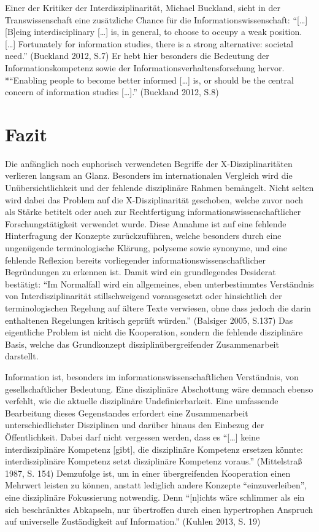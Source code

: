 \documentclass[a4paper,
fontsize=11pt,
oneside,
numbers=noperiodatend,
parskip=half-,
bibliography=totoc,
final
]{scrartcl}
\begin{document}
Einer der Kritiker der Interdisziplinarität, Michael Buckland, sieht in
der Transwissenschaft eine zusätzliche Chance für die
Informationswissenschaft: \enquote{{[}\ldots{}{]} {[}B{]}eing
interdisciplinary {[}\ldots{}{]} is, in general, to choose to occupy a
weak position. {[}\ldots{}{]} Fortunately for information studies, there
is a strong alternative: societal need.} (Buckland 2012, S.7) Er hebt
hier besonders die Bedeutung der Informationskompetenz sowie der
Informationsverhaltensforschung hervor. *\enquote{Enabling people to
become better informed {[}\ldots{}{]} is, or should be the central
concern of information studies {[}\ldots{}{]}.} (Buckland 2012, S.8)

\section*{Fazit}\label{fazit}

Die anfänglich noch euphorisch verwendeten Begriffe der
X-Disziplinaritäten verlieren langsam an Glanz. Besonders im
internationalen Vergleich wird die Unübersichtlichkeit und der fehlende
disziplinäre Rahmen bemängelt. Nicht selten wird dabei das Problem auf
die X-Disziplinarität geschoben, welche zuvor noch als Stärke betitelt
oder auch zur Rechtfertigung informationswissenschaftlicher
Forschungstätigkeit verwendet wurde. Diese Annahme ist auf eine fehlende
Hinterfragung der Konzepte zurückzuführen, welche besonders durch eine
ungenügende terminologische Klärung, polyseme sowie synonyme, und eine
fehlende Reflexion bereits vorliegender informationswissenschaftlicher
Begründungen zu erkennen ist. Damit wird ein grundlegendes Desiderat
bestätigt: \enquote{Im Normalfall wird ein allgemeines, eben
unterbestimmtes Verständnis von Interdisziplinarität stillschweigend
vorausgesetzt oder hinsichtlich der terminologischen Regelung auf ältere
Texte verwiesen, ohne dass jedoch die darin enthaltenen Regelungen
kritisch geprüft würden.} (Balsiger 2005, S.137) Das eigentliche Problem
ist nicht die Kooperation, sondern die fehlende disziplinäre Basis,
welche das Grundkonzept disziplinübergreifender Zusammenarbeit
darstellt.

Information ist, besonders im informationswissenschaftlichen
Verständnis, von gesellschaftlicher Bedeutung. Eine disziplinäre
Abschottung wäre demnach ebenso verfehlt, wie die aktuelle disziplinäre
Undefinierbarkeit. Eine umfassende Bearbeitung dieses Gegenstandes
erfordert eine Zusammenarbeit unterschiedlichster Disziplinen und
darüber hinaus den Einbezug der Öffentlichkeit. Dabei darf nicht
vergessen werden, dass es \enquote{{[}\ldots{}{]} keine
interdisziplinäre Kompetenz {[}gibt{]}, die disziplinäre Kompetenz
ersetzen könnte: interdisziplinäre Kompetenz setzt disziplinäre
Kompetenz voraus.} (Mittelstraß 1987, S. 154) Demzufolge ist, um in
einer übergreifenden Kooperation einen Mehrwert leisten zu können,
anstatt lediglich andere Konzepte \enquote{einzuverleiben}, eine
disziplinäre Fokussierung notwendig. Denn \enquote{{[}n{]}ichts wäre
schlimmer als ein sich beschränktes Abkapseln, nur übertroffen durch
einen hypertrophen Anspruch auf universelle Zuständigkeit auf
Information.} (Kuhlen 2013, S. 19)
\end{document}

